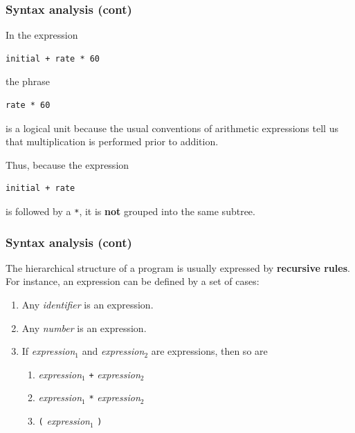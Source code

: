%
\begin{frame}[containsverbatim]
\frametitle{Syntax analysis (cont)}

In the expression
\begin{verbatim}
initial + rate * 60
\end{verbatim} 
the phrase
\begin{verbatim}
rate * 60
\end{verbatim} 
is a logical unit because the usual conventions of arithmetic
 expressions tell us that multiplication is performed prior to
 addition.

\bigskip

Thus, because the expression
\begin{verbatim}
initial + rate
\end{verbatim}
is followed by a \verb+*+, it is \textbf{not} grouped into the same
subtree.

\end{frame}

%
\begin{frame}[containsverbatim]
\frametitle{Syntax analysis (cont)}

The hierarchical structure of a program is usually expressed by
\textbf{recursive rules}. For instance, an expression can be defined
by a set of cases:
\begin{enumerate}

  \item Any \emph{identifier} is an expression.\label{rule_id_is_expr}

  \item Any \emph{number} is an expression.\label{rule_num_is_expr}

  \item If \emph{expression}\(_1\) and \emph{expression}\(_2\) are
  expressions, then so are
   \begin{enumerate}

     \item \emph{expression}\(_1\) \verb|+|
       \emph{expression}\(_2\) \label{rule_add_is_expr}

     \item \emph{expression}\(_1\) \verb|*|
       \emph{expression}\(_2\) \label{rule_mult_is_expr}

     \item \verb|(| \emph{expression}\(_1\)
       \verb|)| \label{rule_paren_is_expr}

   \end{enumerate}

\end{enumerate}

\end{frame}

